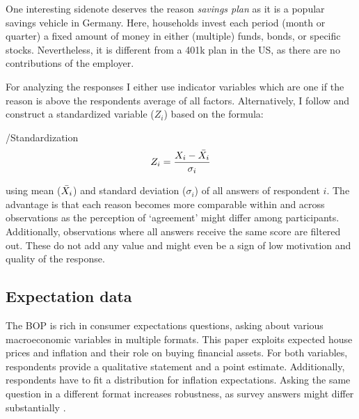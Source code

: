 \documentclass[ProjectABM]{subfiles}
\begin{document}
One interesting sidenote deserves the reason \textit{savings plan} as it is a popular savings vehicle in Germany. Here, households invest each period (month or quarter) a fixed amount of money in either (multiple) funds, bonds, or specific stocks. Nevertheless, it is different from a 401k plan in the US, as there are no contributions of the employer.





For analyzing the responses I either use indicator variables which are one if the reason is above the respondents average of all factors. Alternatively, I follow \cite{choi_2020} and construct a standardized variable ($Z_i$) based on the formula:

\begin{verbatimwrite}{\EqDir/Standardization}
	\begin{align}
		Z_i = \frac{X_i - \Bar{X_i}}{\sigma_i}  \label{eq:standardization}
	\end{align}
\end{verbatimwrite}


using mean ($\Bar{X_i}$) and standard deviation ($\sigma_i$) of all answers of respondent $i$. The advantage is that each reason becomes more comparable within and across observations as the perception of `agreement' might differ among participants. Additionally, observations where all answers receive the same score are filtered out. These do not add any value and might even be a sign of low motivation and quality of the response.
 




\subsection{Expectation data}
The BOP is rich in consumer expectations questions, asking about various macroeconomic variables in multiple formats. This paper exploits expected house prices and inflation and their role on buying financial assets. For both variables, respondents provide a qualitative statement and a point estimate. Additionally, respondents have to fit a distribution for inflation expectations. Asking the same question in a different format increases robustness, as survey answers might differ substantially \citep{potter_et_al_2017prob,diercks2021asymmetric}.
\end{document}
